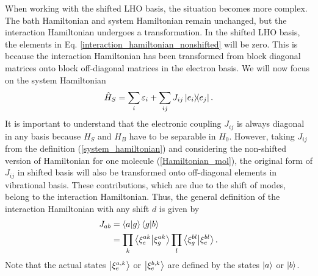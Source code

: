 When working with the shifted LHO basis, the situation becomes more complex. The bath Hamiltonian and system Hamiltonian remain unchanged, but the interaction Hamiltonian undergoes a transformation. In the shifted LHO basis, the elements in Eq. \ref{interaction_hamiltonian_nonshifted} will be zero. This is because the interaction Hamiltonian has been transformed from block diagonal matrices onto block off-diagonal matrices in the electron basis. We will now focus on the system Hamiltonian
\begin{equation}
\label{system_hamiltonian}
    \hat{H}_S = \sum_{i} \varepsilon_i  + \sum_{ij} J_{ij} \ketbra{e_i}{e_j}.
\end{equation}
It is important to understand that the electronic coupling $J_{ij}$ is always diagonal in any basis because $H_S$ and $H_B$ have to be separable in $H_0$. However, taking $J_{ij}$ from the definition (\ref{system_hamiltonian}) and considering the non-shifted version of Hamiltonian for one molecule (\ref{Hamiltonian_mol}), the original form of $J_{ij}$ in shifted basis will also be transformed onto off-diagonal elements in vibrational basis. These contributions, which are due to the shift of modes, belong to the interaction Hamiltonian. Thus, the general definition of the interaction Hamiltonian with any shift $d$ is given by
\begin{equation}
    \begin{aligned}
    J_{ab} &= \braket{a}{g}\braket{g}{b} \\ 
    &= \prod_{k} \braket{\xi^{ak}_e}{\xi^{ak}_g} \prod_{l} \braket{\xi^{bl}_g}{\xi^{bl}_e}. \\
    \end{aligned}
\end{equation}
Note that the actual states $\ket{\xi^{a,k}_e}$ or $\ket{\xi^{b,k}_e}$ are defined by the states $\ket{a}$ or $\ket{b}$. 

